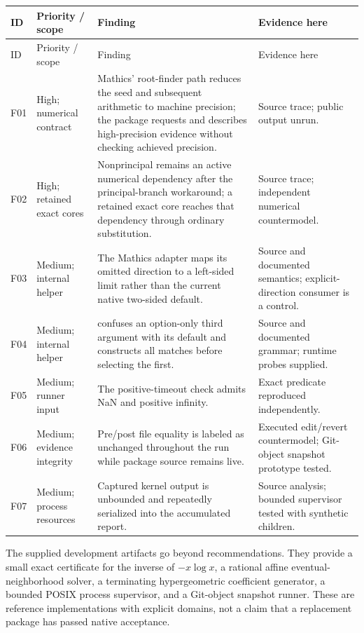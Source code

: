 \documentclass[11pt,letterpaper]{article}
\newcommand{\code}[1]{\texttt{\detokenize{#1}}}
\begin{document}
\begin{longtable}{@{}P{.52in}P{1.24in}P{3.04in}P{1.36in}@{}}
\toprule
ID & Priority / scope & Finding & Evidence here\\
\midrule\endfirsthead
\toprule ID & Priority / scope & Finding & Evidence here\\\midrule\endhead
F01 & High; numerical contract & Mathics' root-finder path reduces the seed and subsequent arithmetic to machine precision; the package requests and describes high-precision evidence without checking achieved precision. & Source trace; public output unrun.\\[5pt]
F02 & High; retained exact cores & Nonprincipal \code{ProductLog} remains an active numerical dependency after the principal-branch workaround; a retained exact core reaches that dependency through ordinary substitution. & Source trace; independent numerical countermodel.\\[5pt]
F03 & Medium; internal helper & The Mathics \code{Limit} adapter maps its omitted direction to a left-sided limit rather than the current native two-sided default. & Source and documented semantics; explicit-direction consumer is a control.\\[5pt]
F04 & Medium; internal helper & \code{FirstPosition} confuses an option-only third argument with its default and constructs all matches before selecting the first. & Source and documented grammar; runtime probes supplied.\\[5pt]
F05 & Medium; runner input & The positive-timeout check admits NaN and positive infinity. & Exact predicate reproduced independently.\\[5pt]
F06 & Medium; evidence integrity & Pre/post file equality is labeled as unchanged throughout the run while package source remains live. & Executed edit/revert countermodel; Git-object snapshot prototype tested.\\[5pt]
F07 & Medium; process resources & Captured kernel output is unbounded and repeatedly serialized into the accumulated report. & Source analysis; bounded supervisor tested with synthetic children.\\
\bottomrule
\end{longtable}

The supplied development artifacts go beyond recommendations. They provide a small exact certificate for the inverse of $-x\log x$, a rational affine eventual-neighborhood solver, a terminating hypergeometric coefficient generator, a bounded POSIX process supervisor, and a Git-object snapshot runner. These are reference implementations with explicit domains, not a claim that a replacement package has passed native acceptance.
\end{document}
